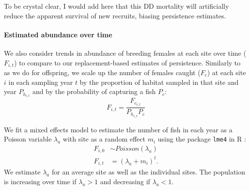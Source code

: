 \documentclass[12pt, oneside]{article}   	%
\begin{document}
To be crystal clear, I would add here that this DD mortality will artificially reduce the apparent survival of  new recruits, biasing persistence estimates.

\paragraph*{Estimated abundance over time}

We also consider trends in abundance of breeding females at each site over time ($F_{i,t}$) to compare to our replacement-based estimates of persistence. Similarly to as we do for offspring, we scale up the number of females caught ($F_c$) at each site $i$ in each sampling year $t$ by the proportion of habitat sampled in that site and year $P_{h_{i,t}}$ and by the probability of capturing a fish $P_c$:
\begin{equation}
F_{i,t} = \frac{F_{c_{i,t}}}{P_{h_{i,t}}P_c}
\end{equation}

We fit a mixed effects model to estimate the number of fish in each year as a Poisson variable $\lambda_a$ with site as a random effect $m_i$ using the package \texttt{lme4} in R \citep{lme42015package}:
\begin{equation} \label{EQN_Abundance}
\begin{split}
F_{i,0} & \sim Poisson(\lambda_a) \\
F_{i,t} & = (\lambda_a + m_i)^t.
\end{split}
\end{equation}
We estimate $\lambda_a$ for an average site as well as the individual sites. The population is increasing over time if $\lambda_a > 1$ and decreasing if $\lambda_a < 1$.

\begin{equation}
\end{equation}
\end{document}
